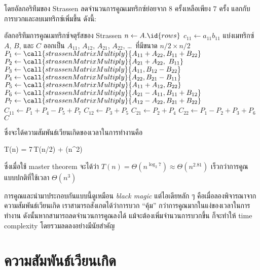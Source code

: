 โดยอัลกอริทึมของ Strassen ลดจำนวนการคูณเมทริกซ์ย่อยจาก $8$ ครั้งเหลือเพียง $7$ ครั้ง แลกกับการบวกและลบเมทริกซ์เพิ่มขึ้น ดังนี้:
\begin{icodebox}{อัลกอริทึมการคูณเมทริกซ์จตุรัสของ Strassen}
		\State $n \gets A.\id{rows}$
			\State $c_{11} \gets a_{11}b_{11}$
		\Else
			\State แบ่งเมทริกซ์ $A$, $B$, และ $C$ ออกเป็น $A_{11}$, $A_{12}$, $A_{21}$, $A_{22}$, \dots\ ที่มีขนาด $n/2 \times n/2$
			\State $P_1 \gets \call{strassenMatrixMultiply}{A_{11} + A_{22}, B_{11} + B_{22}}$
			\State $P_2 \gets \call{strassenMatrixMultiply}{A_{21} + A_{22},\ B_{11}}$
			\State $P_3 \gets \call{strassenMatrixMultiply}{A_{11}, B_{12} - B_{22}}$
			\State $P_4 \gets \call{strassenMatrixMultiply}{A_{22}, B_{21} - B_{11}}$
			\State $P_5 \gets \call{strassenMatrixMultiply}{A_{11} + A_{12}, B_{22}}$
			\State $P_6 \gets \call{strassenMatrixMultiply}{A_{21} - A_{11}, B_{11} + B_{12}}$
			\State $P_7 \gets \call{strassenMatrixMultiply}{A_{12} - A_{22}, B_{21} + B_{22}}$
			\State $C_{11} \gets P_1 + P_4 - P_5 + P_7$
			\State $C_{12} \gets P_3 + P_5$
			\State $C_{21} \gets P_2 + P_4$
			\State $C_{22} \gets P_1 - P_2 + P_3 + P_6$
		\EndIf
		\State \Return $C$
	\EndFunction
\end{icodebox}
ซึ่งจะได้ความสัมพันธ์เวียนเกิดของเวลาในการทำงานคือ
\begin{eqnobox}
	T(n) = 7\,T(n/2) + \Theta(n^2)
\end{eqnobox}
ซึ่งเมื่อใช้ master theorem จะได้ว่า $T(n) = \Theta(n^{\log_2 7}) \approx \Theta(n^{2.81})$ เร็วกว่าการคูณแบบปกติที่ใช้เวลา $\Theta(n^3)$

การคูณและนำมาประกอบกันแบบนี้ดูเหมือน \emph{black magic} แต่ไอเดียหลัก ๆ คือเมื่อลองพิจารณาจากความสัมพันธ์เวียนเกิด เราสามารถสังเกตได้ว่าการบวก ``คุ้ม'' กว่าการคูณมากในแง่ของเวลาในการทำงาน ดังนั้นหากสามารถลดจำนวนการคูณลงได้ แม้จะต้องเพิ่มจำนวนการบวกขึ้น ก็จะทำให้ time complexity โดยรวมลดลงอย่างมีนัยสำคัญ

\section{ความสัมพันธ์เวียนเกิด}